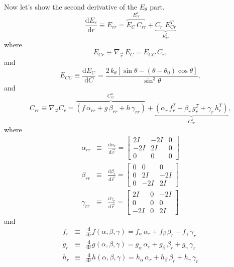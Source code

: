 \documentclass[11pt]{article}
\begin{document}
Now let's show the second derivative of the $E_\theta$ part. 
\begin{equation}
\label{Err}
\frac{\mathrm{d} E_r}{\mathrm{d} r} \equiv E_{rr} = \overbrace{E_{C} \,C_{rr}}^{E_{rr}^a}
+ \underbrace{C_{r} \,\, E_{Cr}^T}_{E_{rr}^b}
\end{equation}
where
\begin{equation}
E_{Cr} \equiv \nabla_{\vec{r}} \, E_{C}  
= E_{CC}\,C_{r},
\end{equation}
and
\begin{equation}
E_{CC} \equiv \frac{\mathrm{d} E_{C}}{\mathrm{d} C}
= \frac{2\,k_{\theta}[\sin\theta - 
(\theta - \theta_0)\cos\theta]}{\sin^3\theta},
\end{equation}
and
\begin{equation}
C_{rr} \equiv \nabla_{\vec{r}}C_{r} = 
\overbrace{
(f \, \alpha_{rr} + 
g \, \beta_{rr} + 
h \, \gamma_{rr})
}^{C_{rr}^a}
 + 
\underbrace{
(\alpha_{r} \, f_r^T + 
\beta_{r} \, g_r^T + 
\gamma_{r} \, h_r^T)
}_{C_{rr}^b},
\label{Crr1}
\end{equation}
where
\begin{eqnarray}
\alpha_{rr} &\equiv& \frac{\mathrm{d} \alpha_r}{\mathrm{d} \vec{r}} 
= \left[ \begin{array}{ccc}
2 I& -2 I & 0\\
-2 I& 2 I& 0\\
0 & 0& 0
\end{array}
\right]\\
\beta_{rr} &\equiv& \frac{\mathrm{d} \beta_r}{\mathrm{d} \vec{r}} 
= \left[ \begin{array}{ccc}
0 & 0& 0 \\
0 & 2 I & -2 I\\
0 & -2 I& 2 I
\end{array}
\right]\\
\gamma_{rr} &\equiv& \frac{\mathrm{d} \gamma_r}{\mathrm{d} \vec{r}} 
= \left[ \begin{array}{ccc}
2 I& 0 &-2 I \\
0 & 0& 0 \\
-2 I& 0 &2 I
\end{array}
\right]
\end{eqnarray}
and
\begin{eqnarray}
f_r &\equiv& \frac{\mathrm{d}}{\mathrm{d} r}f(\alpha, \beta, \gamma)
=f_\alpha \, \alpha_r + 
f_\beta \, \beta_r + 
f_\gamma \, \gamma_r \\
g_r &\equiv& \frac{\mathrm{d}}{\mathrm{d} r}g(\alpha, \beta, \gamma)
=g_\alpha \, \alpha_r + 
g_\beta \, \beta_r + 
g_\gamma \, \gamma_r \\
h_r &\equiv& \frac{\mathrm{d}}{\mathrm{d} r}h(\alpha, \beta, \gamma)
=h_\alpha \, \alpha_r + 
h_\beta \, \beta_r + 
h_\gamma \, \gamma_r \\
\end{eqnarray}
\end{document}
